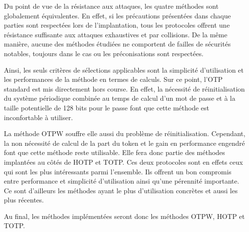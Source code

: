 \documentclass{../res/univ-projet}
\begin{document}
Du point de vue de la résistance aux attaques, les quatre méthodes sont globalement équivalentes. En effet, si les 
précautions présentées dans chaque parties sont respectées lors de l'implantation, tous les protocoles offrent une
résistance suffisante aux attaques exhaustives et par collisions. De la même manière, aucune des méthodes étudiées 
ne comportent de failles de sécurités notables, toujours dans le cas ou les préconisations sont respectées.

Ainsi, les seuls critères de sélections applicables sont la simplicité d'utilisation et les performances de la méthode
en termes de calculs. Sur ce point, l'OTP standard est mis directement hors course. En effet, la nécessité de 
réinitialisation du système périodique combinée au temps de calcul d'un mot de passe et à la taille potentielle de 
128 bits pour le passe font que cette méthode est inconfortable à utiliser.

La méthode OTPW souffre elle aussi du problème de réinitialisation. Cependant, la non nécessité de calcul de la part du 
token et le gain en performance engendré font que cette méthode reste utilisable. Elle fera donc partie des méthodes
implantées au côtés de HOTP et TOTP. Ces deux protocoles sont en effets ceux qui sont les plus intéressants parmi l'ensemble.
Ils offrent un bon compromis entre performance et simplicité d'utilisation ainsi qu'une pérennité importante. Ce sont 
d'ailleurs les méthodes ayant le plus d'utilisation concrètes et aussi les plus récentes.

Au final, les méthodes implémentées seront donc les méthodes OTPW, HOTP et TOTP.
  
\end{document}
